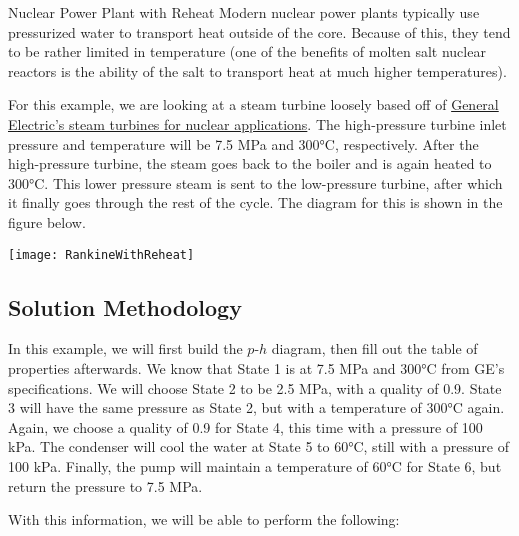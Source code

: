 \begin{example}[label=ex:ch4_supercrit]{Nuclear Power Plant with Reheat}
  Modern nuclear power plants typically use pressurized water to transport heat outside of the core.  Because of this, they tend to be rather limited in temperature (one of the benefits of molten salt nuclear reactors is the ability of the salt to transport heat at much higher temperatures).

  For this example, we are looking at a steam turbine loosely based off of \href{https://www.ge.com/steam-power/products/steam-turbines}{General Electric's  steam turbines for nuclear applications}.  The high-pressure turbine inlet pressure and temperature will be 7.5 MPa and 300°C, respectively.  After the high-pressure turbine, the steam goes back to the boiler and is again heated to 300°C.  This lower pressure steam is sent to the low-pressure turbine, after which it finally goes through the rest of the cycle.  The diagram for this is shown in the figure below.

  \begin{center}
    \texttt{[image: RankineWithReheat]}
  \end{center}
  \subsection*{Solution Methodology}
  In this example, we will first build the $p$-$h$ diagram, then fill out the table of properties afterwards.  We know that State 1 is at 7.5 MPa and 300°C from GE's specifications.  We will choose State 2 to be 2.5 MPa, with a quality of 0.9.  State 3 will have the same pressure as State 2, but with a temperature of 300°C again.  Again, we choose a quality of 0.9 for State 4, this time with a pressure of 100 kPa.  The condenser will cool the water at State 5 to 60°C, still with a pressure of 100 kPa.  Finally, the pump will maintain a temperature of 60°C for State 6, but return the pressure to 7.5 MPa.

  With this information, we will be able to perform the following:


\end{example}
